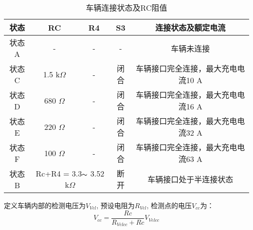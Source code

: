         \begin{table}[!htbp]
            \renewcommand{\arraystretch}{1.3}
            \centering
            \caption{车辆连接状态及RC阻值\cite{GB18487_1}}
            \begin{tabular}{ccccc}   
                 \toprule
                 状态  & RC  & R4 & S3 & 连接状态及额定电流\\    
                 \midrule
                 状态A  & -  & - & - &  车辆未连接 \\
                 状态C  & 1.5 k$\Omega$  & - & 闭合 &  车辆接口完全连接，最大充电电流10 A \\
                 状态D  & 680 $\Omega$  & - &  闭合 &  车辆接口完全连接，最大充电电流16 A  \\
                 状态E  & 220 $\Omega$ & - &   闭合 &  车辆接口完全连接，最大充电电流32 A  \\
                 状态F  & 100 $\Omega$ & - &   闭合 &  车辆接口完全连接，最大充电电流63 A  \\
                 状态B  & \multicolumn{2}{c}{Rc+R4 = 3.3$\thicksim$ 3.52 k$\Omega$} & 断开 &车辆接口处于半连接状态\\
                 \bottomrule
            \end{tabular}
            \label{tab:RC1}
       \end{table}
       定义车辆内部的检测电压为$V_{Vel}$, 预设电阻为$R_{Vel}$, 检测点的电压$V_{cc}$为：
            \begin{equation}
                V_{cc} = \frac{Rc}{R_{Velcc}+Rc} V_{Velcc}
            \end{equation}

